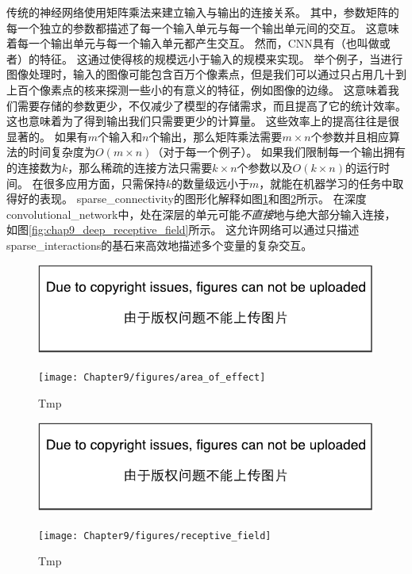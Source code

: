 传统的神经网络使用矩阵乘法来建立输入与输出的连接关系。
其中，参数矩阵的每一个独立的参数都描述了每一个输入单元与每一个输出单元间的交互。
这意味着每一个输出单元与每一个输入单元都产生交互。
然而，\gls{CNN}具有（也叫做或者）的特征。
这通过使得核的规模远小于输入的规模来实现。
举个例子，当进行图像处理时，输入的图像可能包含百万个像素点，但是我们可以通过只占用几十到上百个像素点的核来探测一些小的有意义的特征，例如图像的边缘。
这意味着我们需要存储的参数更少，不仅减少了模型的存储需求，而且提高了它的统计效率。
这也意味着为了得到输出我们只需要更少的计算量。
这些效率上的提高往往是很显著的。
如果有$m$个输入和$n$个输出，那么矩阵乘法需要$m \times n$个参数并且相应算法的时间复杂度为$O(m\times n)$（对于每一个例子）。
如果我们限制每一个输出拥有的连接数为$k$，那么稀疏的连接方法只需要$k\times n$个参数以及$O(k\times n)$的运行时间。
在很多应用方面，只需保持$k$的数量级远小于$m$，就能在机器学习的任务中取得好的表现。
\gls{sparse_connectivity}的图形化解释如图\ref{fig:chap9_area_of_effect}和图\ref{fig:chap9_receptive_field}所示。
在深度\gls{convolutional_network}中，处在深层的单元可能\emph{不直接}地与绝大部分输入连接，如图\ref{fig:chap9_deep_receptive_field}所示。
这允许网络可以通过只描述\gls{sparse_interactions}的基石来高效地描述多个变量的复杂交互。
\begin{figure}[!htb]
\ifOpenSource
\centerline{\includegraphics{figure.pdf}}
\else
\centerline{\texttt{[image: Chapter9/figures/area\_of\_effect]}}
\fi
\caption{Tmp}
\label{fig:chap9_area_of_effect}
\end{figure}
\begin{figure}[!htb]
\ifOpenSource
\centerline{\includegraphics{figure.pdf}}
\else
\centerline{\texttt{[image: Chapter9/figures/receptive\_field]}}
\fi
\caption{Tmp}
\label{fig:chap9_receptive_field}
\end{figure}
